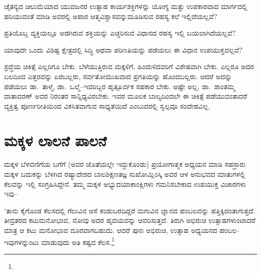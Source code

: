 ಚೈತನ್ಯದ ಚಿಲುಮೆಯಾದ ಯುವಜನರ ಉತ್ಸಾಹ ಕಾರ್ಯಶಕ್ತಿಗಳನ್ನು ಯೋಗ್ಯ ಮತ್ತು ಉಪಕಾರವಾದ ಮಾರ್ಗದಲ್ಲಿ ಹರಿಯುವಂತೆ ಮಾಡಿ ಅವರಲ್ಲಿ ಅಪಾರ ಆತ್ಮವಿಶ್ವಾಸವನ್ನು\break ಮೂಡಿಸುವ ರಹಸ್ಯ ಕಲೆ ಇಲ್ಲಿದೆಯಲ್ಲವೆ?

ಪ್ರತಿಯೊಬ್ಬ ವ್ಯಕ್ತಿಯಲ್ಲೂ ಅಡಗಿರುವ ಶಕ್ತಿಯನ್ನು ಎಚ್ಚರಿಸುವ ವಿಧಾನದ ರಹಸ್ಯ ಇಲ್ಲಿ ಬಯಲಾಗಿದೆಯಲ್ಲವೆ?

ಯಾವುದೇ ಒಂದು ವಿಶಿಷ್ಟ ಕ್ಷೇತ್ರದಲ್ಲಿ ಸಿದ್ಧಿ ಅಥವಾ ಪರಿಣತಿಯನ್ನು ಪಡೆಯಲು ಈ ವಿಧಾನ ಉಪಯುಕ್ತವಲ್ಲವೆ?

ಶ್ರದ್ಧೆಯ ಚಿಕಿತ್ಸೆ ಎಲ್ಲರಿಗೂ ಬೇಕು. ಬೆಳೆಯುತ್ತಿರುವ ಮಕ್ಕಳಿಗೆ, ಹಿಂದುಳಿದವರಿಗೆ ವಿಶೇಷವಾಗಿ ಬೇಕು. ಎಲ್ಲರೂ ಅದರ ಬಲದಿಂದ ಎತ್ತರವನ್ನು ಏರಬಲ್ಲರು, ಸರ್ವತೋಮುಖವಾದ ಪ್ರಗತಿಯನ್ನು ಹೊಂದಬಲ್ಲರು. ಆದರೆ ಅದನ್ನು ಪಡೆಯಲು ಡಾ.\ ತಾಳ್ಮೆ, ಡಾ.\ ಒಲ್ಮೆ–ಇವರಿಬ್ಬರ ಹೃತ್ಪೂರ್ವಕ ಸಹಕಾರ ಬೇಕು. ಅಷ್ಟೇ ಅಲ್ಲ, ಡಾ.\ ಶಾಂತಮ್ಮ ವಾತಾವರಣ್ ಅವರ ನಿರಂತರ ಸಾನ್ನಿಧ್ಯವಿರಬೇಕು. ಇವರ ಮೂಲಕ ಬಾಲ್ಯದಿಂದಲೇ ಈ ಚಿಕಿತ್ಸೆ ಪಡೆಯುವಂತಾದರೆ ವ್ಯಕ್ತಿತ್ವ ಪೂರ್ಣರೀತಿಯಿಂದ ವಿಕಸಿತವಾಗುವ ಸಾಧ್ಯತೆಯಿದೆ ಎಂಬುದರಲ್ಲಿ ಸ್ವಲ್ಪವೂ ಸಂದೇಹವಿಲ್ಲ.

\medskip


\section*{ಮಕ್ಕಳ ಲಾಲನೆ ಪಾಲನೆ}


ಮಕ್ಕಳ ಬೆಳವಣಿಗೆಯ ಬಗೆಗೆ (ಅವರ ಜೊತೆಯಲ್ಲೇ ಇದ್ದುಕೊಂಡು) ಪ್ರಯೋಗಾತ್ಮಕ ಅಧ್ಯಯನ ಮಾಡಿ ಸಹಸ್ರಾರು ಮಕ್ಕಳ ಬದುಕನ್ನು ಬೆಳಗಿದ ರಷ್ಯಾದೇಶದ ಬಾಲಶಿಕ್ಷಣತಜ್ಞ ಸುಖೋಮ್ಲಿಂಸ್ಕಿ ಅವರ ಆಳ ಅನುಭವದ ಮಾತುಗಳಲ್ಲಿ ಕೆಲವನ್ನು ಇಲ್ಲಿ ಸಂಗ್ರಹಿಸಿದ್ದೇನೆ. ತಮ್ಮ ಮಕ್ಕಳ ಅಭ್ಯುದಯಾಕಾಂಕ್ಷಿಗಳು ಗಮನಿಸಬೇಕಾದ ಉಪಯುಕ್ತ ವಿಚಾರಗಳು ಇವು–

\vskip 4.5pt

‘ತಾನು ಕೈಗೊಂಡ ಕೆಲಸದಲ್ಲಿ ಗೆಲುವಿನ ಆಸೆ ಕಂಡುಬರದಿದ್ದರೆ ಮಗುವಿನ ಜ್ಞಾನದ ಹಂಬಲವನ್ನು ಹತ್ತಿಕ್ಕಿದಂತಾಗುತ್ತದೆ. ತೀವ್ರತರದ ಕಟುಮನೋಭಾವ, ನೋವು ಅದರ ಹೃದಯವನ್ನು ಆವರಿಸುತ್ತದೆ. ತಿರುಗಿ ಅಭಿರುಚಿ ಉತ್ಸಾಹಗಳುಂಟಾದರೆ ಮಾತ್ರ ಆ ಕಟು ಮನೋಭಾವ ದೂರವಾಗಬಹುದು. ಆದರೆ ಪುನಃ ಅಭಿರುಚಿ, ಉತ್ಸಾಹ ಅಧ್ಯಯನದ ಹಂಬಲ–ಇವುಗಳನ್ನುಂಟು ಮಾಡುವುದು ಅತಿ ಕಷ್ಟದ ಕೆಲಸ.\footnote{

\hfill{}}

